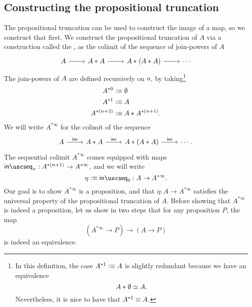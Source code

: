 \subsection{Constructing the propositional truncation}
The propositional truncation can be used to construct the image of a map, so we construct that first. We construct the propositional truncation of $A$ via a construction called the , as the colimit of the sequence of join-powers of $A$
\begin{equation*}
  \begin{tikzcd}
    A \arrow[r] & \join{A}{A} \arrow[r] & \join{A}{(\join{A}{A})} \arrow[r] & \cdots
  \end{tikzcd}
\end{equation*}
The join-powers of $A$ are defined recursively on $n$, by taking\footnote{In this definition, the case $A^{\ast1}\vcentcolon\equiv A$ is slightly redundant because we have an equivalence
\begin{equation*}
  {A}\ast_{}{\emptyset}\simeq A.
\end{equation*}
Nevertheless, it is nice to have that $A^{\ast 1}\equiv A$.}
\begin{align*}
  A^{\ast0} & \vcentcolon\equiv \emptyset \\
  A^{\ast 1} & \vcentcolon\equiv A \\
  A^{\ast(n+2)} & \vcentcolon\equiv {A}\ast_{}{A^{\ast (n+1)}}.
\end{align*}
We will write $A^{\ast\infty}$ for the colimit of the sequence
\begin{equation*}
  \begin{tikzcd}
    A \arrow[r,"\inr"] & \join{A}{A} \arrow[r,"\inr"] & \join{A}{(\join{A}{A})} \arrow[r,"\inr"] & \cdots.
  \end{tikzcd}
\end{equation*}
The sequential colimit $A^{\ast\infty}$ comes equipped with maps $\inseq_n:A^{\ast (n+1)}\to A^{\ast\infty}$, and we will write
\begin{equation*}
  \eta\defeq\inseq_0:A\to A^{\ast\infty}.
\end{equation*}
Our goal is to show $A^{\ast\infty}$ is a proposition, and that $\eta:A\to A^{\ast\infty}$ satisfies the universal property of the propositional truncation of $A$. Before showing that $A^{\ast\infty}$ is indeed a proposition, let us show in two steps that for any proposition $P$, the map
\begin{equation*}
  (A^{\ast\infty}\to P)\to (A\to P)
\end{equation*}
is indeed an equivalence. 


